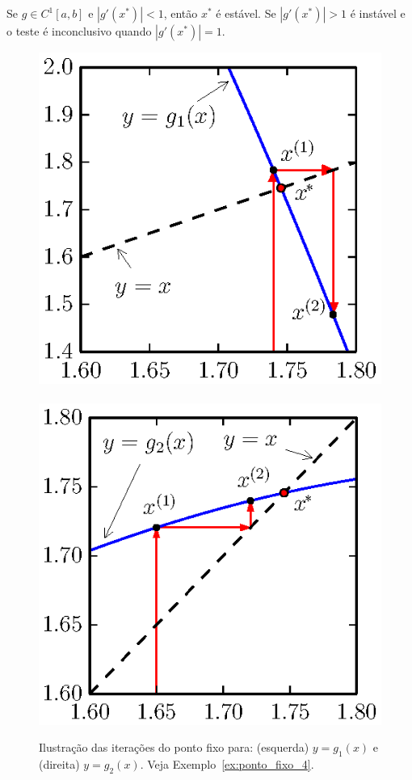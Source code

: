 \begin{ex}
\begin{prop}
 Se $g\in C^1[a,b]$ e  $|g'(x^*)|<1$, então $x^*$ é estável. Se $|g'(x^*)|>1$ é instável e o teste é inconclusivo quando $|g'(x^*)|=1$.
\end{prop}

\begin{figure}[h]
    \centering
        \includegraphics{./cap_equacao1d/pics/ponto_fixo_instavel/ponto_fixo_instavel.eps}
~
        \includegraphics{./cap_equacao1d/pics/ponto_fixo_estavel/ponto_fixo_estavel.eps}
    \caption{Ilustração das iterações do ponto fixo para: (esquerda) $y = g_1(x)$ e (direita) $y = g_2(x)$. Veja Exemplo~\ref{ex:ponto_fixo_4}.} \label{fig:teste_de_convergencia}
\end{figure}


\end{ex}
